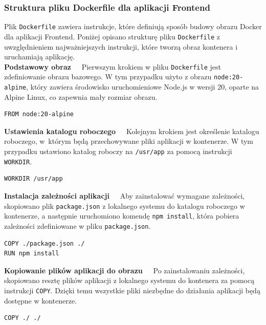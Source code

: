 \subsubsection{Struktura pliku Dockerfile dla aplikacji Frontend}

Plik \texttt{Dockerfile} zawiera instrukcje, które definiują sposób budowy obrazu Docker dla aplikacji Frontend. Poniżej opisano strukturę pliku \texttt{Dockerfile} z uwzględnieniem najważniejszych instrukcji, które tworzą obraz kontenera i uruchamiają aplikację.\\[-10pt]

\noindent \textbf{Podstawowy obraz~~}
Pierwszym krokiem w pliku \texttt{Dockerfile} jest zdefiniowanie obrazu bazowego. W tym przypadku użyto z obrazu \texttt{node:20-alpine}, który zawiera środowisko uruchomieniowe Node.js w wersji 20, oparte na Alpine Linux, co zapewnia mały rozmiar obrazu.
\begin{lstlisting}[basicstyle=\footnotesize\ttfamily]
FROM node:20-alpine
\end{lstlisting}

\noindent \textbf{Ustawienia katalogu roboczego~~}
Kolejnym krokiem jest określenie katalogu roboczego, w~którym będą przechowywane pliki aplikacji w kontenerze. W tym przypadku ustawiono katalog roboczy na \texttt{/usr/app} za pomocą instrukcji \texttt{WORKDIR}.
\begin{lstlisting}[basicstyle=\footnotesize\ttfamily]
WORKDIR /usr/app
\end{lstlisting}

\noindent \textbf{Instalacja zależności aplikacji~~}
Aby zainstalować wymagane zależności, skopiowano plik \texttt{package.json} z lokalnego systemu do katalogu roboczego w kontenerze, a następnie uruchomiono komendę \texttt{npm install}, która pobiera zależności zdefiniowane w pliku \texttt{package.json}.
\begin{lstlisting}[basicstyle=\footnotesize\ttfamily]
COPY ./package.json ./
RUN npm install
\end{lstlisting}

\noindent \textbf{Kopiowanie plików aplikacji do obrazu~~}
Po zainstalowaniu zależności, skopiowano resztę plików aplikacji z lokalnego systemu do kontenera za pomocą instrukcji \texttt{COPY}. Dzięki temu wszystkie pliki niezbędne do działania aplikacji będą dostępne w kontenerze.
\begin{lstlisting}[basicstyle=\footnotesize\ttfamily]
COPY ./ ./
\end{lstlisting}

